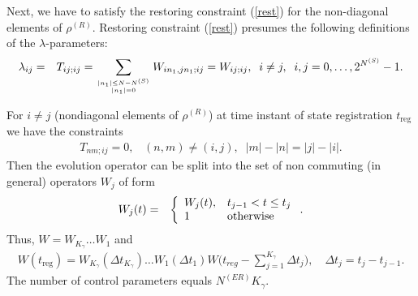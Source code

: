\documentclass[pra,preprint,showpacs]{revtex4-1}
\begin{document}
 Next, we have to satisfy the restoring constraint (\ref{rest}) for the non-diagonal elements of $\rho^{(R)}$.
Restoring constraint  (\ref{rest})  presumes  the following definitions of  the $\lambda$-parameters:
\begin{eqnarray}\label{K}
\lambda_{ij} &=&T_{ij;ij}=\sum_{{|n_1|\le N-N^{(S)}}\atop{|n_1|=0}}W_{i n_1,jn_1 ;ij}  =W_{ij;ij}  ,\;\; i\neq j,\;\; i,j=0,\dots,2^{N^{(S)}}-1.
\end{eqnarray}
\iffalse
In particular,
\begin{eqnarray}\label{K1}
\lambda_{0j} &=&T_{0j;0j}=\sum_{n_1 =0}^{2^{N-N^{(S)}}-1}W_{0 n_1,jn_1 ;0j}=W_{0j ;0j}   ,\;\;j=0,\dots,2^{N^{(S)}}-1.
\end{eqnarray}
For 1-excitation block we have
\begin{eqnarray}\label{K2}
\lambda_{ij} &=&T_{ij;ij}=\sum_{n_1 =0}^{2^{N-N^{(S)}}-1}W_{i n_1,jn_1 ;0j}=W_{i j ;ij}   ,\;\;i,j=0,\dots,2^{N^{(S)}}-1.
\end{eqnarray}
\fi
For $i\neq j $ (nondiagonal elements of $\rho^{(R)}$) at time instant of state registration $t_{\mathrm{reg}}$ we have the constraints
\begin{eqnarray}\label{constr0}\label{P1}
T_{nm;ij}=0, \;\;\;(n,m)\neq (i,j), \;\;|m|-|n|=|j|-|i|.
\end{eqnarray}
 Then the evolution operator can be split into the set of non commuting (in general) operators $W_j$ of form
\begin{eqnarray}\label{VV}
W_j(t) &=& \left\{
\begin{array}{ll}
W_j(t) ,& t_{j-1} < t\le t_j\cr
1  & {\mbox{otherwise}}
\end{array}
\right..
\end{eqnarray}
Thus, $W = W_{K_\gamma}\dots W_1$ and
\begin{eqnarray}\label{UtK}
W(t_{\mathrm{reg}})=  W_{K_\gamma}(\Delta t_{K_\gamma})\dots W_1(\Delta t_1) W\Big(t_{reg} - \sum_{j=1}^{K_\gamma} \Delta t_j\Big),\quad  \Delta t_j = t_j -t_{j-1}.
\end{eqnarray}
The number of control parameters equals $N^{(ER)} K_\gamma$.
\end{document}
